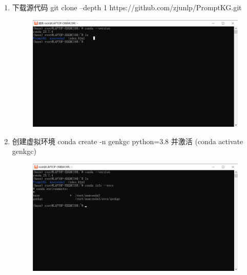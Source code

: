\documentclass{article}
\begin{document}
\begin{enumerate}
\newpage
    \item 下载源代码  git clone --depth 1 https://github.com/zjunlp/PromptKG.git
\begin{figure}[htp]
        \centering
        \includegraphics[width=16cm]{代码下载.png}
        \caption{}
        \label{pic7}
\end{figure}

\newpage
    \item 创建虚拟环境 conda create -n genkgc python=3.8 并激活 (conda activate genkgc)
\begin{figure}[htp]
        \centering
        \includegraphics[width=16cm]{虚拟环境.png}
        \caption{}
        \label{pic7}
\end{figure}


\end{enumerate}
\end{document}
